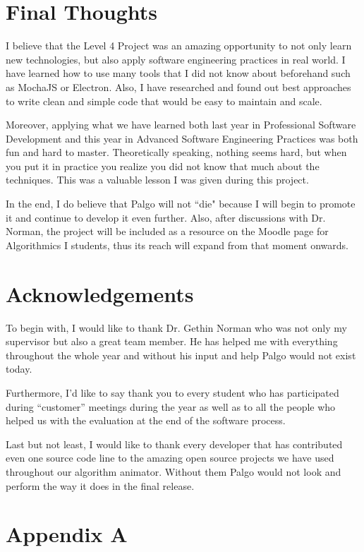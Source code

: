 \documentclass{l4proj}
\begin{document}
\section{Final Thoughts}

I believe that the Level 4 Project was an amazing opportunity to not only learn new technologies, but also apply
software engineering practices in real
world. I have learned how to use many tools that I did not know about beforehand such as MochaJS or Electron. Also, I
have researched and found out best approaches to write clean and simple code that would be easy to maintain and scale. 

Moreover, applying what we have learned both last year in Professional Software Development and this year in Advanced Software Engineering Practices was both fun and hard to master.
Theoretically speaking, nothing seems hard, but when you put it in practice you realize you did not know that much about
the techniques. This was a valuable lesson I was given during this project.

In the end, I do believe that Palgo will not ``die" because I will begin to promote it and continue to develop it even
further. Also, after discussions with Dr. Norman, the project will be included as a resource on the Moodle page for
Algorithmics I students, thus its reach will expand from that moment onwards.

\section{Acknowledgements}

To begin with, I would like to thank Dr. Gethin Norman who was not only my supervisor but also a great team member. He
has helped me with everything throughout the whole year and without his input and help Palgo would not exist today.

Furthermore, I'd like to say thank you to every student who has participated during ``customer'' meetings during the year
as well as to all the people who helped us with the evaluation at the end of the software process.

Last but not least, I would like to thank every developer that has contributed even one source code line to the amazing open source projects
we have used throughout our algorithm animator. Without them Palgo would not look and perform the way it does in
the final release.


\appendix
\section{Appendix A}



\end{document}
